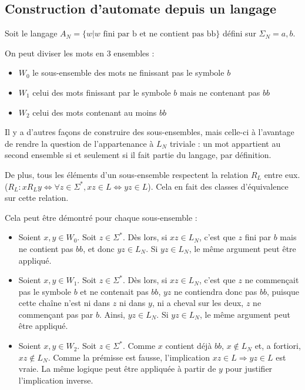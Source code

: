 	 \subsection{Construction d'automate depuis un langage}
	 
	 Soit le langage $A_N = \{w | w \text{ fini par b et ne contient pas bb}\}$ défini sur $\Sigma_N = {a,b}$.
	 
	 On peut diviser les mots en 3 ensembles : 
	 
	 \begin{itemize}
	 	\item $W_0$ le sous-ensemble des mots ne finissant pas le symbole $b$
	 	\item $W_1$ celui des mots finissant par le symbole $b$ mais ne contenant pas $bb$
	 	\item $W_2$ celui des mots contenant au moins $bb$
	 \end{itemize}
	 
	 Il y a d'autres façons de construire des sous-ensembles, mais celle-ci à l'avantage de rendre la question de l'appartenance à $L_N$ triviale : un mot appartient au second ensemble si et seulement si il fait partie du langage, par définition.
	 
	 De plus, tous les éléments d'un sous-ensemble respectent la relation $R_L$ entre eux. ($R_L : xR_Ly \Leftrightarrow \forall z \in \Sigma^*, xz \in L \Leftrightarrow yz \in L$). Cela en fait des classes d'équivalence sur cette relation.
	 
	 Cela peut être démontré pour chaque sous-ensemble :
	 \begin{itemize}
	 	\item Soient $x,y \in W_0$. Soit $z \in \Sigma^*$. Dès lors, si $xz \in L_N$, c'est que $z$ fini par $b$ mais ne contient pas $bb$, et donc $yz \in L_N$. Si $yz \in L_N$, le même argument peut être appliqué.
	 	\item Soient $x,y \in W_1$. Soit $z \in \Sigma^*$. Dès lors, si $xz \in L_N$, c'est que $z$ ne commençait pas le symbole $b$ et ne contenait pas $bb$, $yz$ ne contiendra donc pas $bb$, puisque cette chaîne n'est ni dans $z$ ni dans $y$, ni a cheval sur les deux, $z$ ne commençant pas par $b$. Ainsi, $yz \in L_N$. Si $yz \in L_N$, le même argument peut être appliqué.
	 	\item Soient $x,y \in W_2$. Soit $z \in \Sigma^*$. Comme $x$ contient déjà $bb$, $x \notin L_N$ et, a fortiori, $xz \notin L_N$. Comme la prémisse est fausse, l'implication $xz \in L \Rightarrow yz \in L$ est vraie. La même logique peut être appliquée à partir de $y$ pour justifier l'implication inverse.
	 \end{itemize}
	 
